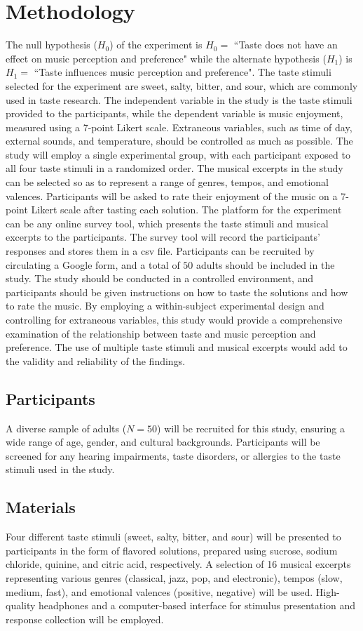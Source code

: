 \documentclass[conference]{IEEEtran}
\begin{document}
\section{Methodology}
The null hypothesis ($H_0$) of the experiment is 
$H_0 = $ ``Taste does not have an effect on music perception and preference" while the alternate hypothesis ($H_1$) is 
$H_1 = $ ``Taste influences music perception and preference". The taste stimuli selected for the experiment are sweet, salty, bitter, and sour, which are commonly used in taste research.
The independent variable in the study is the taste stimuli provided to the participants, while the dependent variable is music enjoyment, measured using a 7-point Likert scale. Extraneous variables, such as time of day, external sounds, and temperature, should be controlled as much as possible. The study will employ a single experimental group, with each participant exposed to all four taste stimuli in a randomized order.
The musical excerpts in the study can be selected so as to represent a range of genres, tempos, and emotional valences. Participants will be asked to rate their enjoyment of the music on a 7-point Likert scale after tasting each solution. The platform for the experiment can be any online survey tool, which presents the taste stimuli and musical excerpts to the participants. The survey tool will record the participants' responses and stores them in a csv file. Participants can be recruited by circulating a Google form, and a total of $50$ adults should be included in the study. The study should be conducted in a controlled environment, and participants should be given instructions on how to taste the solutions and how to rate the music.
By employing a within-subject experimental design and controlling for extraneous variables, this study would provide a comprehensive examination of the relationship between taste and music perception and preference. The use of multiple taste stimuli and musical excerpts would add to the validity and reliability of the findings.
\subsection{Participants}
A diverse sample of adults ($N=50$) will be recruited for this study, ensuring a wide range of age, gender, and cultural backgrounds. Participants will be screened for any hearing impairments, taste disorders, or allergies to the taste stimuli used in the study.

\subsection{Materials}
Four different taste stimuli (sweet, salty, bitter, and sour) will be presented to participants in the form of flavored solutions, prepared using sucrose, sodium chloride, quinine, and citric acid, respectively. A selection of 16 musical excerpts representing various genres (classical, jazz, pop, and electronic), tempos (slow, medium, fast), and emotional valences (positive, negative) will be used. High-quality headphones and a computer-based interface for stimulus presentation and response collection will be employed.
\end{document}
